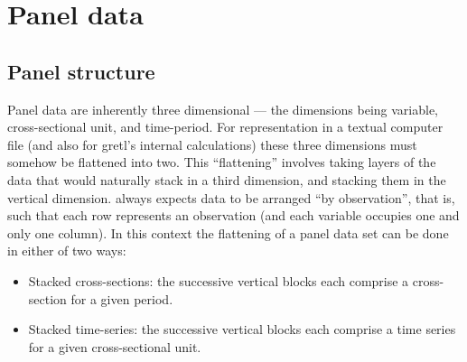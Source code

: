 \chapter{Panel data}
\label{chap-panel}



\section{Panel structure}
\label{panel-structure}

Panel data are inherently three dimensional --- the
      dimensions being variable, cross-sectional unit, and
      time-period.  For representation in a textual computer file (and
      also for gretl's internal calculations) these three dimensions
      must somehow be flattened into two.  This
      ``flattening'' involves taking layers of the data
      that would naturally stack in a third dimension, and stacking
      them in the vertical dimension. always expects data to be
      arranged ``by observation'', that is, such that each
      row represents an observation (and each variable occupies one
      and only one column).  In this context the flattening of a panel
      data set can be done in either of two ways:
\begin{itemize}
\item 
	  Stacked cross-sections: the successive vertical blocks each
	  comprise a cross-section for a given period.
\item 
	  Stacked time-series: the successive vertical blocks each
	  comprise a time series for a given cross-sectional
	  unit.
\end{itemize}

